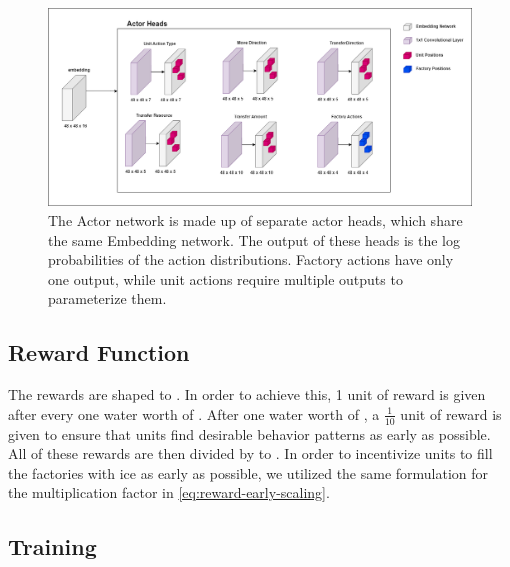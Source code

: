\begin{figure}[htbp]
    \centering
    \includegraphics[width=1\linewidth]{images/methods_hybrid/actor_critic/actor.png}
    \captionsetup{justification=justified, singlelinecheck=false, width=1\linewidth, labelfont=bf} 
    \caption[]{The Actor network is made up of separate actor heads, which share the same Embedding network. The output of these heads is the log probabilities of the action distributions. Factory actions have only one output, while unit actions require multiple outputs to parameterize them.}
    \label{fig:actor}
\end{figure}

\subsection{Reward Function}
\label{subsec:hyb-rew}

\noindent The rewards are shaped to . In order to achieve this, 1 unit of reward is given after every one water worth of . After  one water worth of , a $\frac{1}{10}$ unit of reward is given to ensure that units find desirable behavior patterns as early as possible. All of these rewards are then divided by to . In order to incentivize units to fill the factories with ice as early as possible, we utilized the same formulation for the multiplication factor in \autoref{eq:reward-early-scaling}.

\subsection{Training}

